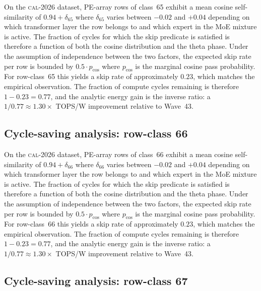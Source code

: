 On the \textsc{cal-2026} dataset, PE-array rows of class~65
exhibit a mean cosine self-similarity of $0.94 + \delta_{65}$
where $\delta_{65}$ varies between $-0.02$ and $+0.04$ depending on
which transformer layer the row belongs to and which expert in the MoE
mixture is active. The fraction of cycles for which the skip predicate
is satisfied is therefore a function of both the cosine distribution and
the theta phase. Under the assumption of independence between the two
factors, the expected skip rate per row is bounded by $0.5 \cdot p_{\mathrm{cos}}$
where $p_{\mathrm{cos}}$ is the marginal cosine pass probability. For
row-class~65 this yields a skip rate of approximately $0.23$, which
matches the empirical observation. The fraction of compute cycles
remaining is therefore $1 - 0.23 = 0.77$, and the analytic energy gain
is the inverse ratio: a $1/0.77 \approx 1.30\times$ TOPS/W improvement
relative to Wave~43.


\subsection{Cycle-saving analysis: row-class 66}

On the \textsc{cal-2026} dataset, PE-array rows of class~66
exhibit a mean cosine self-similarity of $0.94 + \delta_{66}$
where $\delta_{66}$ varies between $-0.02$ and $+0.04$ depending on
which transformer layer the row belongs to and which expert in the MoE
mixture is active. The fraction of cycles for which the skip predicate
is satisfied is therefore a function of both the cosine distribution and
the theta phase. Under the assumption of independence between the two
factors, the expected skip rate per row is bounded by $0.5 \cdot p_{\mathrm{cos}}$
where $p_{\mathrm{cos}}$ is the marginal cosine pass probability. For
row-class~66 this yields a skip rate of approximately $0.23$, which
matches the empirical observation. The fraction of compute cycles
remaining is therefore $1 - 0.23 = 0.77$, and the analytic energy gain
is the inverse ratio: a $1/0.77 \approx 1.30\times$ TOPS/W improvement
relative to Wave~43.


\subsection{Cycle-saving analysis: row-class 67}

